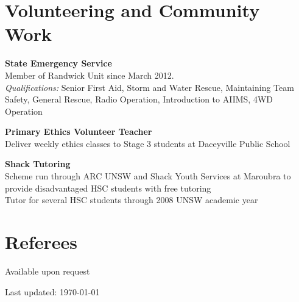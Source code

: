 \documentclass[10pt,a4paper]{article}
\renewenvironment{itemize}{
\begin{list}{}{
\setlength{\leftmargin}{1.5em}
\setlength{\itemsep}{0.25em}
\setlength{\parskip}{0pt}
\setlength{\parsep}{0.25em}
}
}{
\end{list}
}
\begin{document}
\section*{Volunteering and Community Work}
\begin{itemize}
\item \textbf{State Emergency Service} \\ 
Member of Randwick Unit since March 2012.\\ 
\textit{Qualifications:} Senior First Aid, Storm and Water Rescue,
Maintaining Team Safety, General Rescue, Radio Operation, Introduction to AIIMS,
4WD Operation  

\vspace{0.1cm}
\item \textbf{Primary Ethics Volunteer Teacher}\\
Deliver weekly ethics classes to Stage 3 students at Daceyville 
Public School

\vspace{0.1cm}
\item \textbf{Shack Tutoring}\\
Scheme run through ARC UNSW and Shack Youth Services at Maroubra to
provide disadvantaged HSC students with free tutoring\\ 
Tutor for several HSC students through 2008 UNSW academic year
\end{itemize}

\vspace{-0.6cm}
\section*{Referees}

Available upon request

\begin{center}
\begin{small}
Last updated: \today
\end{small}
\end{center}
\end{document}

